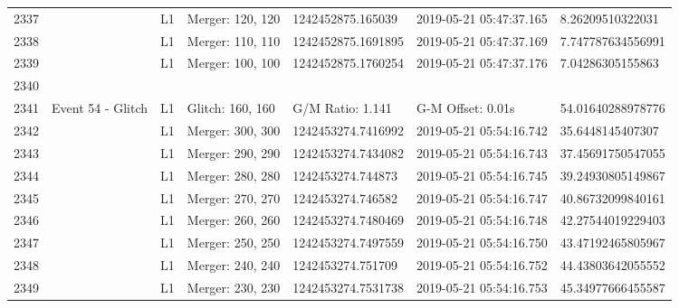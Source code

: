 \begin{longtable}{lllllll}
2337 &                                                    &       L1 &  Merger: 120, 120 &   1242452875.165039 &  2019-05-21 05:47:37.165 &    8.26209510322031 \\
2338 &                                                    &       L1 &  Merger: 110, 110 &  1242452875.1691895 &  2019-05-21 05:47:37.169 &   7.747787634556991 \\
2339 &                                                    &       L1 &  Merger: 100, 100 &  1242452875.1760254 &  2019-05-21 05:47:37.176 &    7.04286305155863 \\
2340 &                                                    &          &                   &                     &                          &                     \\
2341 &                                  Event 54 - Glitch &       L1 &  Glitch: 160, 160 &    G/M Ratio: 1.141 &        G-M Offset: 0.01s &   54.01640288978776 \\
2342 &                                                    &       L1 &  Merger: 300, 300 &  1242453274.7416992 &  2019-05-21 05:54:16.742 &    35.6448145407307 \\
2343 &                                                    &       L1 &  Merger: 290, 290 &  1242453274.7434082 &  2019-05-21 05:54:16.743 &   37.45691750547055 \\
2344 &                                                    &       L1 &  Merger: 280, 280 &   1242453274.744873 &  2019-05-21 05:54:16.745 &   39.24930805149867 \\
2345 &                                                    &       L1 &  Merger: 270, 270 &   1242453274.746582 &  2019-05-21 05:54:16.747 &   40.86732099840161 \\
2346 &                                                    &       L1 &  Merger: 260, 260 &  1242453274.7480469 &  2019-05-21 05:54:16.748 &   42.27544019229403 \\
2347 &                                                    &       L1 &  Merger: 250, 250 &  1242453274.7497559 &  2019-05-21 05:54:16.750 &   43.47192465805967 \\
2348 &                                                    &       L1 &  Merger: 240, 240 &   1242453274.751709 &  2019-05-21 05:54:16.752 &   44.43803642055552 \\
2349 &                                                    &       L1 &  Merger: 230, 230 &  1242453274.7531738 &  2019-05-21 05:54:16.753 &   45.34977666455587 \\

\end{longtable}

